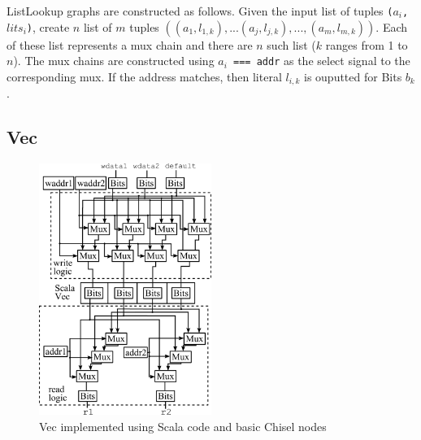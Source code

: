 ListLookup graphs are constructed as follows. Given the input list of
tuples {\tt ($a_i$, $lits_i$)}, create $n$ list of $m$ tuples
{\tt $( (a_1, l_{1, k}), ... (a_j, l_{j, k}), ..., (a_m, l_{m, k})
  )$}. Each of these list represents a mux chain and there are $n$
such list ($k$ ranges from 1 to $n$). The mux chains are constructed
using {\tt $a_i$ === addr} as the select signal to the corresponding
mux. If the address matches, then literal {\tt $l_{i, k}$} is ouputted
for Bits $b_k$.

\subsection{Vec}
\begin{figure}[htb]
\centering
\includegraphics[width=0.5\textwidth]{figures/vecscala.pdf}
\caption{Vec implemented using Scala code and basic Chisel nodes}
\label{fig:vecscala}
\end{figure}
